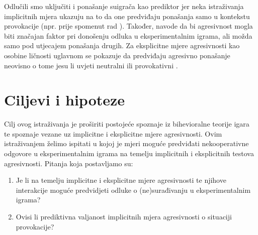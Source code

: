 \documentclass[a4paper, 12pt]{report}
\begin{document}
Odlučili smo uključiti i ponašanje suigrača kao prediktor jer neka istraživanja
implicitnih mjera ukazuju na to da one predviđaju ponašanja samo u kontekstu
provokacije (npr. prije spomenut rad \citealp{richetin2010predictive}). Također,
\citet{vancoop} navode da bi agresivnost mogla biti značajan faktor pri
donošenju odluka u eksperimentalnim igrama, ali možda samo pod utjecajem
ponašanja drugih. Za eksplicitne mjere agresivnosti kao osobine
ličnosti uglavnom se pokazuje da predviđaju agresivno ponašanje neovisno o tome
jesu li uvjeti neutralni ili provokativni \citep{bettencourt2006personality}.

\section{Ciljevi i hipoteze}

Cilj ovog istraživanja je proširiti postojeće spoznaje iz bihevioralne teorije
igara te spoznaje vezane uz implicitne i eksplicitne mjere agresivnosti.
Ovim istraživanjem želimo ispitati u kojoj je mjeri moguće predviđati
nekooperativne odgovore u eksperimentalnim igrama na temelju implicitnih i 
eksplicitnih testova agresivnosti. Pitanja koja postavljamo su: 

\begin{enumerate}[label = (\arabic*)]
    \itemsep0em
    \item Je li na temelju implicitne i eksplicitne mjere agresivnosti te
        njihove interakcije moguće predvidjeti odluke o (ne)surađivanju u eksperimentalnim
        igrama?
    \item Ovisi li prediktivna valjanost implicitnih mjera agresivnosti o
        situaciji provokacije?
\end{enumerate}
\end{document}
